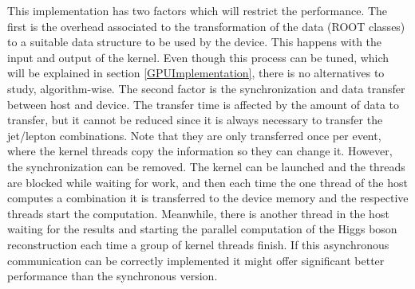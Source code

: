 This implementation has two factors which will restrict the performance. The first is the overhead associated to the transformation of the data (ROOT classes) to a suitable data structure to be used by the device. This happens with the input and output of the kernel. Even though this process can be tuned, which will be explained in section \ref{GPUImplementation}, there is no alternatives to study, algorithm-wise. The second factor is the synchronization and data transfer between host and device. The transfer time is affected by the amount of data to transfer, but it cannot be reduced since it is always necessary to transfer the jet/lepton combinations. Note that they are only transferred once per event, where the kernel threads copy the information so they can change it. However, the synchronization can be removed. The kernel can be launched and the threads are blocked while waiting for work, and then each time the one thread of the host computes a combination it is transferred to the device memory and the respective threads start the computation. Meanwhile, there is another thread in the host waiting for the results and starting the parallel computation of the Higgs boson reconstruction each time a group of kernel threads finish. If this asynchronous communication can be correctly implemented it might offer significant better performance than the synchronous version.